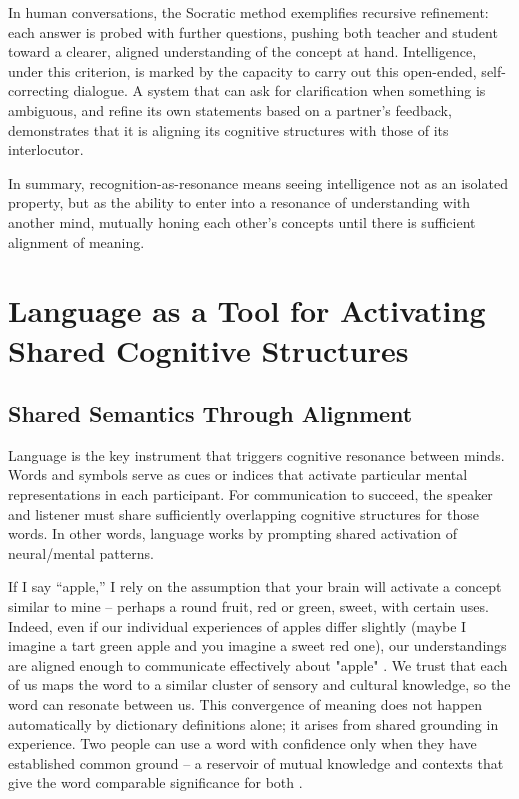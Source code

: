 \documentclass{article}
\begin{document}
In human conversations, the Socratic method exemplifies recursive refinement: each answer is probed with further questions, pushing both teacher and student toward a clearer, aligned understanding of the concept at hand. Intelligence, under this criterion, is marked by the capacity to carry out this open-ended, self-correcting dialogue. A system that can ask for clarification when something is ambiguous, and refine its own statements based on a partner's feedback, demonstrates that it is aligning its cognitive structures with those of its interlocutor.

In summary, recognition-as-resonance means seeing intelligence not as an isolated property, but as the ability to enter into a resonance of understanding with another mind, mutually honing each other's concepts until there is sufficient alignment of meaning.

\section{Language as a Tool for Activating Shared Cognitive Structures}

\subsection{Shared Semantics Through Alignment}

Language is the key instrument that triggers cognitive resonance between minds. Words and symbols serve as cues or indices that activate particular mental representations in each participant. For communication to succeed, the speaker and listener must share sufficiently overlapping cognitive structures for those words. In other words, language works by prompting shared activation of neural/mental patterns.

If I say ``apple,'' I rely on the assumption that your brain will activate a concept similar to mine -- perhaps a round fruit, red or green, sweet, with certain uses. Indeed, even if our individual experiences of apples differ slightly (maybe I imagine a tart green apple and you imagine a sweet red one), our understandings are aligned enough to communicate effectively about "apple" \citep{rane2024}. We trust that each of us maps the word to a similar cluster of sensory and cultural knowledge, so the word can resonate between us. This convergence of meaning does not happen automatically by dictionary definitions alone; it arises from shared grounding in experience. Two people can use a word with confidence only when they have established common ground -- a reservoir of mutual knowledge and contexts that give the word comparable significance for both \citep{rane2024}.
\end{document}
